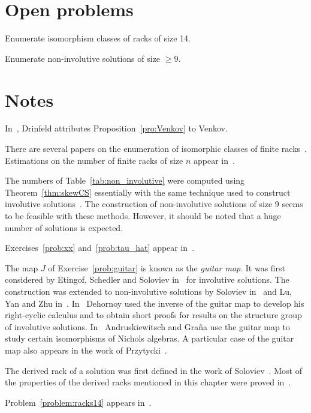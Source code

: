\section*{Open problems}

\begin{problem}
\label{problem:racks14}
Enumerate isomorphism classes of racks of size 14. 
\end{problem}

\begin{problem}
Enumerate non-involutive solutions of size $\geq9$. 
\end{problem}


\section*{Notes}

In~\cite{MR1183474}, Drinfeld attributes Proposition~\ref{pro:Venkov} to Venkov. 

There are several papers on the enumeration of isomorphic classes of finite racks~\cite{MR3665565,MR3118951,MR3904151}. 
Estimations on the number of finite
racks of size $n$ appear in~\cite{MR3118951}. 

The numbers of Table~\ref{tab:non_involutive} were computed using 
Theorem~\ref{thm:skewCS} essentially with the same technique used to construct involutive solutions~\cite{AMV}. 
The construction of non-involutive solutions of size 9 seems to be feasible with these methods. 
However, it should be noted that a huge number of solutions is expected. 

Exercises~\ref{prob:xx} and~\ref{prob:tau_hat} appear in~\cite{MR3974961}. 

The map $J$ of Exercise~\ref{prob:guitar} is known as the \emph{guitar map}. 
It was first considered by Etingof, Schedler and
Soloviev in~\cite{MR1722951} for involutive solutions. The construction was extended to non-involutive solutions
by Soloviev in~\cite{MR1809284} and Lu, Yan and Zhu in~\cite{MR1769723}. In~\cite{MR3374524} Dehornoy
used the inverse of the guitar map to develop his right-cyclic calculus and to
obtain short proofs for results on the structure group of involutive solutions. 
In~\cite{MR1994219} Andruskiewitsch and Graña use the guitar map to study certain isomorphisms of Nichols algebras. 
A particular case of the guitar map also appears in the work of Przytycki~\cite{MR2906433}. 

The derived rack of a solution was first defined in the work of Soloviev~\cite{MR1809284}. Most of the properties
of the derived racks mentioned in this chapter were proved in~\cite{MR3974961}.

Problem~\ref{problem:racks14} appears in~\cite{MR3957904}. 

